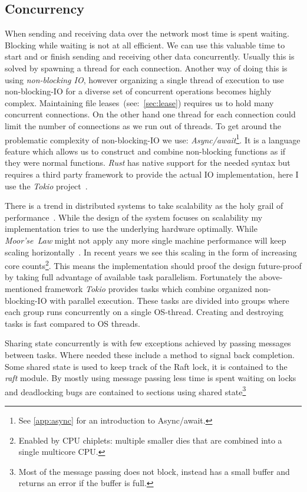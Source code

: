 \subsection{Concurrency}
When sending and receiving data over the network most time is spent waiting. Blocking while waiting is not at all efficient. We can use this valuable time to start and or finish sending and receiving other data concurrently. Usually this is solved by spawning a thread for each connection. Another way of doing this is using \textit{non-blocking IO}, however organizing a single thread of execution to use non-blocking-IO for a diverse set of concurrent operations becomes highly complex. 
Maintaining file leases~(see:~\cref{sec:lease}) requires us to hold many concurrent connections. On the other hand one thread for each connection could limit the number of connections as we run out of threads. To get around the problematic complexity of non-blocking-IO we use: \textit{Async/await}\footnote{See \cref{app:async} for an introduction to Async/await.}. It is a language feature which allows us to construct and combine non-blocking functions as if they were normal functions. \textit{Rust} has native support for the needed syntax but requires a third party framework to provide the actual IO implementation, here I use the \textit{Tokio} project~\cite{tokio}.

There is a trend in distributed systems to take scalability as the holy grail of performance~\cite{scaling}. While the design of the system focuses on scalability my implementation tries to use the underlying hardware optimally. 
While \textit{Moor'se~Law} might not apply any more single machine performance will keep scaling horizontally~\cite{moore}. In recent years we see this scaling in the form of increasing core counts\footnote{Enabled by CPU chiplets: multiple smaller dies that are combined into a single multicore CPU.}. This means the implementation should proof the design future-proof by taking full advantage of available task parallelism. Fortunately the above-mentioned framework \textit{Tokio} provides tasks which combine organized non-blocking-IO with parallel execution. These tasks are divided into groups where each group runs concurrently on a single OS-thread. Creating and destroying tasks is fast compared to OS threads.

Sharing state concurrently is with few exceptions achieved by passing messages between tasks. Where needed these include a method to signal back completion. Some shared state is used to keep track of the Raft lock, it is contained to the \textsl{raft} module. By mostly using message passing less time is spent waiting on locks and deadlocking bugs are contained to sections using shared state\footnote{Most of the message passing does not block, instead has a small buffer and returns an error if the buffer is full.} 

